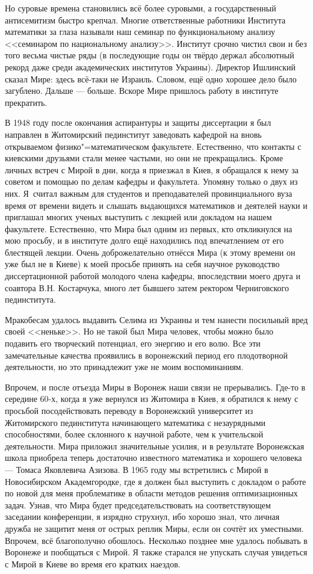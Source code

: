 Но суровые времена становились всё более суровыми, а государственный антисемитизм быстро крепчал. Многие ответственные работники Института математики за глаза называли наш семинар по функциональному анализу <<семинаром по национальному анализу>>. Институт срочно чистил свои и без того весьма чистые ряды (в последующие годы он твёрдо держал абсолютный рекорд даже среди академических институтов Украины). Директор Ишлинский сказал Мире: здесь всё-таки не Израиль. Словом, ещё одно хорошее дело было загублено. Дальше --- больше. Вскоре Мире пришлось работу в институте прекратить.

В 1948 году после окончания аспирантуры и защиты диссертации я был направлен
в Житомирский пединститут заведовать кафедрой на вновь открываемом фи\-зи\-ко"=ма\-те\-ма\-ти\-че\-с\-ком факультете.
Естественно, что контакты с киевскими друзьями стали менее частыми, но они не прекращались.
Кроме личных встреч с Мирой в дни, когда я приезжал в Киев,
я обращался к нему за советом и помощью по делам кафедры и факультета. Упомяну только о двух из них.
Я~считал важным для студентов и преподавателей провинциального вуза время от времени видеть и слышать выдающихся математиков и деятелей науки и приглашал многих ученых выступить с лекцией или докладом на нашем факультете. Естественно, что Мира был одним из первых, кто откликнулся на мою просьбу, и в институте долго ещё находились под впечатлением от его блестящей лекции. Очень доброжелательно отнёсся Мира (к этому времени он уже был не в Киеве) к моей просьбе принять на себя научное руководство диссертационной работой молодого члена кафедры, впоследствии моего друга и соавтора В.Н. Костарчука, много лет бывшего затем ректором Черниговского пединститута.

Мракобесам удалось выдавить Селима из Украины и тем нанести посильный вред своей <<неньке>>. Но не такой был Мира человек, чтобы можно было подавить его творческий потенциал, его энергию и его волю. Все эти замечательные качества проявились в воронежский период его плодотворной деятельности, но это принадлежит уже не моим воспоминаниям.

Впрочем, и после отъезда Миры в Воронеж наши связи не прерывались. Где-то в середине 60-х, когда я уже вернулся из Житомира в Киев, я обратился к нему с просьбой посодействовать переводу в Воронежский университет из Житомирского пединститута начинающего математика с незаурядными способностями, более склонного к научной работе, чем к учительской деятельности. Мира приложил значительные усилия, и в результате Воронежская школа приобрела теперь достаточно известного математика и хорошего человека --- Томаса Яковлевича Азизова. В 1965 году мы встретились с Мирой в Новосибирском Академгородке, где я должен был выступить с докладом о работе по новой для меня проблематике в области методов решения оптимизационных задач. Узнав, что Мира будет председательствовать на соответствующем заседании конференции, я изрядно струхнул, ибо хорошо знал, что личная дружба не защитит меня от острых реплик Миры, если он сочтёт их уместными. Впрочем, всё благополучно обошлось. Несколько позднее мне удалось побывать в Воронеже и пообщаться с Мирой. Я также старался не упускать случая увидеться с Мирой в Киеве во время его кратких наездов.

